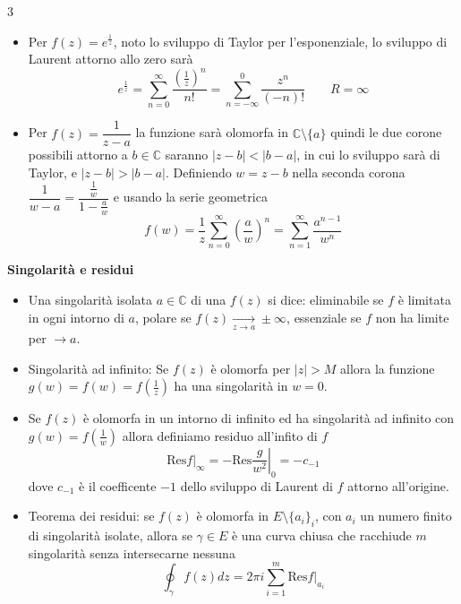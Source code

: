 \documentclass[10pt,a4paper]{report}
\begin{document}
\begin{multicols*}{3}
\begin{center}
\begin{itemize}[label=$\cdot$]
\[		\]
		\item Per $f(z)=e^{\frac{1}{z}}$, noto lo sviluppo di Taylor per l'esponenziale, lo sviluppo di Laurent attorno allo zero sarà \[e^{\frac{1}{z}}=\sum_{n=0}^\infty \dfrac{\left(\frac{1}{z}\right)^n}{n!}=\sum_{n=-\infty}^{0} \dfrac{z^n}{(-n)!} \qquad R=\infty\]
		\item Per $f(z)=\dfrac{1}{z-a}$ la funzione sarà olomorfa in $\mathbb{C}\setminus\{a\}$ quindi le due corone possibili attorno a  $b\in\mathbb{C}$ saranno $|z-b|<|b-a|$, in cui lo sviluppo sarà di Taylor, e $|z-b|>|b-a|$. Definiendo $w=z-b$ nella seconda corona $\dfrac{1}{w-a}=\dfrac{\frac{1}{w}}{1-\frac{a}{w}}$ e usando la serie geometrica
		\[
		f(w)=\dfrac{1}{z}\sum_{n=0}^\infty \left(\dfrac{a}{w}\right)^n =\sum_{n=1}^{\infty}\dfrac{a^{n-1}}{w^n}
		\] 
	\end{itemize}
\par
\textbf{Singolarità e residui} \par
	\begin{itemize}[label=$\cdot$]
		\item Una singolarità isolata $a\in\mathbb{C}$ di una $f(z)$ si dice: eliminabile se $f$ è limitata in ogni intorno di $a$, polare se $f(z)\underset{z\rightarrow a}{\longrightarrow}\pm\infty$, essenziale se $f$ non ha limite per $\rightarrow a$.
		\item Singolarità ad infinito: Se $f(z)$ è olomorfa per $|z|>M$ allora la funzione $g(w)=f(w)=f(\frac{1}{z})$ ha una singolarità in $w=0$.
		\item Se $f(z)$ è olomorfa in un intorno di infinito ed ha singolarità ad infinito con $g(w)=f(\frac{1}{w})$ allora definiamo residuo all'infito di $f$
		\[
		\left.\text{Res}f\right|_{\infty} =- \left.\text{Res}\dfrac{g}{w^2}\right|_{0}=-c_{-1}
		\]
		dove $c_{-1}$ è il coefficente $-1$ dello sviluppo di Laurent di $f$ attorno all'origine.
		\item Teorema dei residui: se $f(z)$ è olomorfa in $E\setminus\{a_i\}_i$, con $a_i$ un numero finito di singolarità isolate, allora se $\gamma\in E$ è una curva chiusa che racchiude $m$ singolarità senza intersecarne nessuna
		\[
		\oint_\gamma f(z)dz=2\pi i \sum_{i=1}^m \left.\text{Res}f\right|_{a_i}
		\]
		

\end{itemize}
\end{center}
\end{multicols*}
\end{document}

